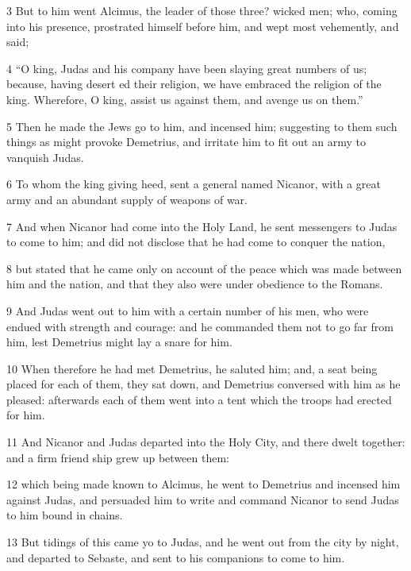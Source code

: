 \par 3 But to him went Alcimus, the leader of those three? wicked men; who, coming into his presence, prostrated himself before him, and wept most vehemently, and said; 

\par 4 “O king, Judas and his company have been slaying great numbers of us; because, having desert ed their religion, we have embraced the religion of the king. Wherefore, O king, assist us against them, and avenge us on them.”

\par 5 Then he made the Jews go to him, and incensed him; suggesting to them such things as might provoke Demetrius, and irritate him to fit out an army to vanquish Judas. 

\par 6 To whom the king giving heed, sent a general named Nicanor, with a great army and an abundant supply of weapons of war. 

\par 7 And when Nicanor had come into the Holy Land, he sent messengers to Judas to come to him; and did not disclose that he had come to conquer the nation, 

\par 8 but stated that he came only on account of the peace which was made between him and the nation, and that they also were under obedience to the Romans. 

\par 9 And Judas went out to him with a certain number of his men, who were endued with strength and courage: and he commanded them not to go far from him, lest Demetrius might lay a snare for him.

\par 10 When therefore he had met Demetrius, he saluted him; and, a seat being placed for each of them, they sat down, and Demetrius conversed with him as he pleased: afterwards each of them went into a tent which the troops had erected for him. 

\par 11 And Nicanor and Judas departed into the Holy City, and there dwelt together: and a firm friend ship grew up between them: 

\par 12 which being made known to Alcimus, he went to Demetrius and incensed him against Judas, and persuaded him to write and command Nicanor to send Judas to him bound in chains. 

\par 13 But tidings of this came yo to Judas, and he went out from the city by night, and departed to Sebaste, and sent to his companions to come to him. 

